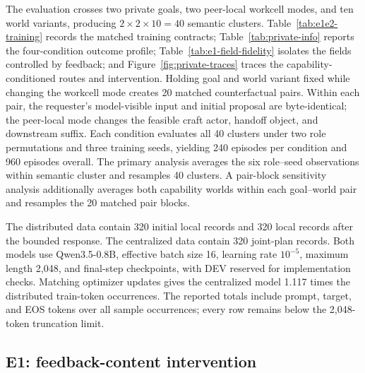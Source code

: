 \documentclass[10pt]{article}
\newcommand{\tabstyle}{\small\setlength{\tabcolsep}{2.5pt}\renewcommand{\arraystretch}{1.10}}
\begin{document}
The evaluation crosses two private goals, two peer-local workcell modes, and ten world variants, producing $2\times2\times10=40$ semantic clusters. Table~\ref{tab:e1e2-training} records the matched training contracts; Table~\ref{tab:private-info} reports the four-condition outcome profile; Table~\ref{tab:e1-field-fidelity} isolates the fields controlled by feedback; and Figure~\ref{fig:private-traces} traces the capability-conditioned routes and intervention. Holding goal and world variant fixed while changing the workcell mode creates 20 matched counterfactual pairs. Within each pair, the requester's model-visible input and initial proposal are byte-identical; the peer-local mode changes the feasible craft actor, handoff object, and downstream suffix. Each condition evaluates all 40 clusters under two role permutations and three training seeds, yielding 240 episodes per condition and 960 episodes overall. The primary analysis averages the six role--seed observations within semantic cluster and resamples 40 clusters. A pair-block sensitivity analysis additionally averages both capability worlds within each goal--world pair and resamples the 20 matched pair blocks.

\begin{table}[!htbp]
  \centering
  \caption{Training contracts for the Goal--Capability models. Train-token occurrences sum tokenized prompt, target, and EOS across all epochs.}
  \label{tab:e1e2-training}
  \tabstyle
  
\end{table}

The distributed data contain 320 initial local records and 320 local records after the bounded response. The centralized data contain 320 joint-plan records. Both models use Qwen3.5-0.8B, effective batch size 16, learning rate $10^{-5}$, maximum length 2,048, and final-step checkpoints, with DEV reserved for implementation checks. Matching optimizer updates gives the centralized model 1.117 times the distributed train-token occurrences. The reported totals include prompt, target, and EOS tokens over all sample occurrences; every row remains below the 2,048-token truncation limit.

\subsection{E1: feedback-content intervention}

\begin{table}[!htbp]
  \centering
  \caption{E1/E2 outcomes on 40 semantic clusters, arranged as 20 matched counterfactual pairs. Intervals are primary cluster-bootstrap 95\% CIs. Strict success requires all six role--seed observations of a cluster to succeed; the final column names the measured boundary component rather than total architecture traffic.}
  \label{tab:private-info}
  \tabstyle
  
\end{table}
\end{document}
